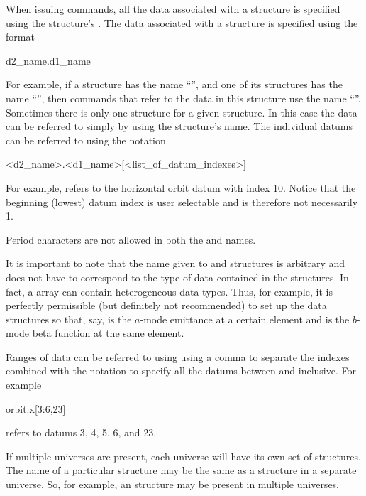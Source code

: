 When issuing \tao commands, all the data associated with a  structure is specified using
the  structure's .  The data associated with a  structure is
specified using the format
\begin{example}
  d2_name.d1_name
\end{example}
For example, if a  structure has the name ``'', and one of its 
structures has the name ``'', then \tao commands that refer to the data in this 
structure use the name ``''. Sometimes there is only one  structure for a
given  structure. In this case the data can be referred to simply by using the
 structure's name. The individual datums can be referred to using the notation
\begin{example}
  <d2_name>.<d1_name>[<list_of_datum_indexes>]
\end{example}
For example,  refers to the horizontal orbit datum with index 10. Notice that the
beginning (lowest) datum index is user selectable and is therefore not necessarily 1.

Period characters are not allowed in both the  and  names.

It is important to note that the name given to  and  structures is arbitrary
and does not have to correspond to the type of data contained in the structures. In fact, a
 array can contain heterogeneous data types.  Thus, for example, it is perfectly
permissible (but definitely not recommended) to set up the data structures so that, say,
 is the $a$-mode emittance at a certain element and  is the $b$-mode
beta function at the same element.

Ranges of data can be referred to using using a comma \vn{,} to separate the indexes combined with
the notation  to specify all the datums between  and  inclusive. For example
\begin{example}
  orbit.x[3:6,23]
\end{example}
refers to datums 3, 4, 5, 6, and 23. 

If multiple universes are present, each universe will have its own set of 
structures. The name of a particular  structure may be the same as a 
structure in a separate universe. So, for example, an   structure may
be present in multiple universes.

